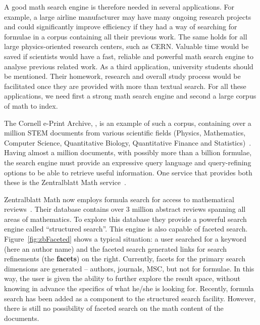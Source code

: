 A good math search engine is therefore needed in several applications.
For example, a large airline manufacturer may have many ongoing research
projects and could significantly improve efficiency if they had a way of
searching for formulae in a corpus containing all their previous work. The same
holds for all large physics-oriented research centers, such as CERN. Valuable
time would be saved if scientists would have a fast, reliable and powerful math
search engine to analyse previous related work. As a third application,
university students should be mentioned. Their homework, research and overall
study process would be facilitated once they are provided with more than
textual search. For all these applications, we need first a strong math search
engine and second a large corpus of math to index.

The Cornell e-Print Archive, \arxiv, is an example of such a corpus, containing
over a million STEM documents from various scientific fields (Physics,
Mathematics, Computer Science, Quantitative Biology, Quantitative Finance and
Statistics)~\cite{arXiv:online}. Having almost a million documents, with
possibly more than a billion formulae, the search engine must provide an
expressive query language and query-refining options to be able to retrieve
useful information. One service that provides both these is the Zentralblatt
Math service~\cite{zbmath:online}.

Zentralblatt Math now employs formula search for access to mathematical
reviews~\cite{KohMihSperTes:mfs13}. Their database contains over 3 million
abstract reviews spanning all areas of mathematics. To explore this database
they provide a powerful search engine called ``structured search''. This engine
is also capable of faceted search.  Figure~\ref{fig:zbFaceted} shows a typical
situation: a user searched for a keyword (here an author name) and the faceted
search generated links for search refinements (the \textbf{facets}) on the
right. Currently, facets for the primary search dimensions are generated --
authors, journals, MSC, but not for formulae. In this way, the user is given
the ability to further explore the result space, without knowing in advance the
specifics of what he/she is looking for.  Recently, formula search has been
added as a component to the structured search facility. However, there is still
no possibility of faceted search on the math content of the documents.

